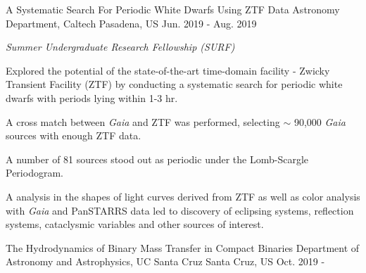 \begin{cventries}
\cventry
{A Systematic Search For Periodic White Dwarfs Using ZTF Data} %
{Astronomy Department, Caltech} %
{Pasadena, US} %
{Jun. 2019 - Aug. 2019} %
{ %
	\begin{cvitems}
		\item {\textit{Summer Undergraduate Research Fellowship (SURF)}}
		\item {Explored the potential of the state-of-the-art time-domain facility - Zwicky Transient Facility (ZTF) by conducting a systematic search for periodic white dwarfs with periods lying within 1-3 hr.}
		\item {A cross match between \textit{Gaia} and ZTF was performed, selecting $\sim$ 90,000 \textit{Gaia} sources with enough ZTF data.}
		\item {A number of 81 sources stood out as periodic under the Lomb-Scargle Periodogram. }
		\item {A analysis in the shapes of light curves derived from ZTF as well as color analysis with \textit{Gaia} and PanSTARRS data led to discovery of eclipsing systems, reflection systems, cataclysmic variables and other sources of interest.}
	\end{cvitems}
}

\cventry
{The Hydrodynamics of Binary Mass Transfer in Compact Binaries} %
{Department of Astronomy and Astrophysics, UC Santa Cruz} %
{Santa Cruz, US} %
{Oct. 2019 -} %
{ %
	\begin{cvitems}
		\item {}
	\end{cvitems}
}

\end{cventries}